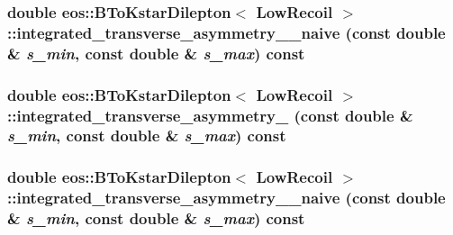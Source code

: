 \label{classeos_1_1BToKstarDilepton_3_01LowRecoil_01_4_a871b934798288f80764e1ea4b5f74110}
\hypertarget{classeos_1_1BToKstarDilepton_3_01LowRecoil_01_4_a0fd4a54246acdea45c7bf8022ed2b8b4}{
\subsubsection[{integrated\_\-transverse\_\-asymmetry\_\-2\_\-naive}]{\setlength{\rightskip}{0pt plus 5cm}double eos::BToKstarDilepton$<$ {\bf LowRecoil} $>$::integrated\_\-transverse\_\-asymmetry\_\_\-naive (const double \& {\em s\_\-min}, \/  const double \& {\em s\_\-max}) const}}
\label{classeos_1_1BToKstarDilepton_3_01LowRecoil_01_4_a0fd4a54246acdea45c7bf8022ed2b8b4}
\hypertarget{classeos_1_1BToKstarDilepton_3_01LowRecoil_01_4_ac72f802ae9d30f8acb2e229851956795}{
\subsubsection[{integrated\_\-transverse\_\-asymmetry\_\-3}]{\setlength{\rightskip}{0pt plus 5cm}double eos::BToKstarDilepton$<$ {\bf LowRecoil} $>$::integrated\_\-transverse\_\-asymmetry\_ (const double \& {\em s\_\-min}, \/  const double \& {\em s\_\-max}) const}}
\label{classeos_1_1BToKstarDilepton_3_01LowRecoil_01_4_ac72f802ae9d30f8acb2e229851956795}
\hypertarget{classeos_1_1BToKstarDilepton_3_01LowRecoil_01_4_a365d7cf15da41dfe34c5edb16df2c812}{
\subsubsection[{integrated\_\-transverse\_\-asymmetry\_\-3\_\-naive}]{\setlength{\rightskip}{0pt plus 5cm}double eos::BToKstarDilepton$<$ {\bf LowRecoil} $>$::integrated\_\-transverse\_\-asymmetry\_\_\-naive (const double \& {\em s\_\-min}, \/  const double \& {\em s\_\-max}) const}}
